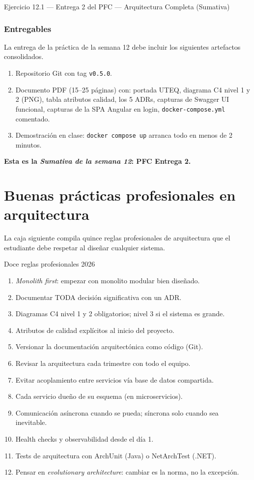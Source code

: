 \begin{cajaejercicio}{Ejercicio 12.1 --- Entrega 2 del PFC --- Arquitectura Completa (Sumativa)}
\subsubsection*{Entregables}

La entrega de la práctica de la semana 12 debe incluir los
siguientes artefactos consolidados.


\begin{enumerate}
\item Repositorio Git con tag \texttt{v0.5.0}.
\item Documento PDF (15--25 páginas) con: portada UTEQ, diagrama C4
nivel 1 y 2 (PNG), tabla atributos calidad, los 5 ADRs, capturas de
Swagger UI funcional, capturas de la SPA Angular en login,
\texttt{docker-compose.yml} comentado.
\item Demostración en clase: \texttt{docker compose up} arranca todo
en menos de 2 minutos.
\end{enumerate}

\textbf{Esta es la \emph{Sumativa de la semana 12}: PFC Entrega 2.}
\end{cajaejercicio}

\section{Buenas prácticas profesionales en arquitectura}

La caja siguiente compila quince reglas profesionales de
arquitectura que el estudiante debe respetar al diseñar cualquier
sistema.


\begin{cajabuenas}{Doce reglas profesionales 2026}
\begin{enumerate}
\item \emph{Monolith first}: empezar con monolito modular bien
diseñado.
\item Documentar TODA decisión significativa con un ADR.
\item Diagramas C4 nivel 1 y 2 obligatorios; nivel 3 si el sistema
es grande.
\item Atributos de calidad explícitos al inicio del proyecto.
\item Versionar la documentación arquitectónica como código (Git).
\item Revisar la arquitectura cada trimestre con todo el equipo.
\item Evitar acoplamiento entre servicios vía base de datos
compartida.
\item Cada servicio dueño de su esquema (en microservicios).
\item Comunicación asíncrona cuando se pueda; síncrona solo cuando
sea inevitable.
\item Health checks y observabilidad desde el día 1.
\item Tests de arquitectura con ArchUnit (Java) o NetArchTest (.NET).
\item Pensar en \emph{evolutionary architecture}: cambiar es la
norma, no la excepción.
\end{enumerate}
\end{cajabuenas}


